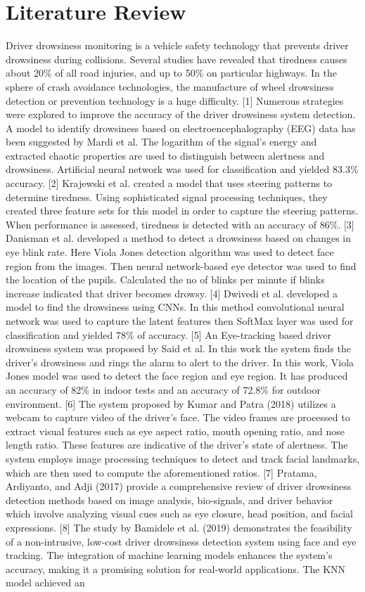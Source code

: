 \documentclass[conference]{IEEEtran}
\begin{document}
\section{Literature Review}
Driver drowsiness monitoring is a vehicle safety technology that prevents driver drowsiness during collisions. Several studies have revealed that tiredness causes about 20\% of all road injuries, and up to 50\% on particular highways. In the sphere of crash avoidance technologies, the manufacture of wheel drowsiness detection or prevention technology is a huge difficulty. [1] Numerous strategies were explored to improve the accuracy of the driver drowsiness system detection. A model to identify drowsiness based on electroencephalography (EEG) data has been suggested by Mardi et al.  The logarithm of the signal's energy and extracted chaotic properties are used to distinguish between alertness and drowsiness. Artificial neural network was used for classification and yielded 83.3\% accuracy. [2] Krajewski et al. created a model that uses steering patterns to determine tiredness. Using sophisticated signal processing techniques, they created three feature sets for this model in order to capture the steering patterns. When performance is assessed, tiredness is detected with an accuracy of 86\%. [3] Danisman et al. developed a method to detect a drowsiness based on changes in eye blink rate. Here Viola Jones detection algorithm was used to detect face region from the images. Then neural network-based eye detector was used to find the location of the pupils. Calculated the no of blinks per minute if blinks increase indicated that driver becomes drowsy. [4] Dwivedi et al. developed a model to find the drowsiness using CNNs. In this method convolutional neural network was used to capture the latent features then SoftMax layer was used for classification and yielded 78\% of accuracy. [5] An Eye-tracking based driver drowsiness system was proposed by Said et al. In this work the system finds the driver’s drowsiness and rings the alarm to alert to the driver. In this work, Viola Jones model was used to detect the face region and eye region. It has produced an accuracy of 82\% in indoor tests and an accuracy of 72.8\% for outdoor environment. [6] The system proposed by Kumar and Patra (2018) utilizes a webcam to capture video of the driver’s face. The video frames are processed to extract visual features such as eye aspect ratio, mouth opening ratio, and nose length ratio. These features are indicative of the driver’s state of alertness. The system employs image processing techniques to detect and track facial landmarks, which are then used to compute the aforementioned ratios. [7] Pratama, Ardiyanto, and Adji (2017) provide a comprehensive review of driver drowsiness detection methods based on image analysis, bio-signals, and driver behavior which involve analyzing visual cues such as eye closure, head position, and facial expressions. [8] The study by Bamidele et al. (2019) demonstrates the feasibility of a non-intrusive, low-cost driver drowsiness detection system using face and eye tracking. The integration of machine learning models enhances the system’s accuracy, making it a promising solution for real-world applications. The KNN model achieved an 
\end{document}
